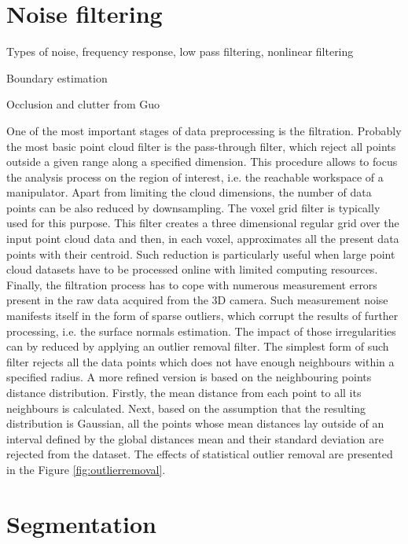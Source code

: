 \section{Noise filtering}
\label{sec:noise}

Types of noise, frequency response, low pass filtering, nonlinear filtering

Boundary estimation

Occlusion and clutter from Guo

One of the most important stages of data preprocessing is the filtration. Probably the most basic point cloud filter is the pass-through filter, which reject all points outside a given range along a specified dimension. This procedure allows to focus the analysis process on the region of interest, i.e. the reachable workspace of a manipulator. Apart from limiting the cloud dimensions, the number of data points can be also reduced by downsampling. The voxel grid filter is typically used for this purpose. This filter creates a three dimensional regular grid over the input point cloud data and then, in each voxel, approximates all the present data points with their centroid. Such reduction is particularly useful when large point cloud datasets have to be processed online with limited computing resources. Finally, the filtration process has to cope with numerous measurement errors present in the raw data acquired from the 3D camera. Such measurement noise 
manifests itself in the form of sparse outliers, which corrupt the results of further processing, i.e. the surface normals estimation. The impact of those irregularities can by reduced by applying an outlier removal filter. The simplest form of such filter rejects all the data points which does not have enough neighbours within a specified radius. A more refined version is based on the neighbouring points distance distribution. Firstly, the mean distance from each point to all its neighbours is calculated. Next, based on the assumption that the resulting distribution is Gaussian, all the points whose mean distances lay outside of an interval defined by the global distances mean and their standard deviation are rejected from the dataset. The effects of statistical outlier removal are presented in the Figure \ref{fig:outlierremoval}.


\section{Segmentation}
\label{sec:segmentation}


